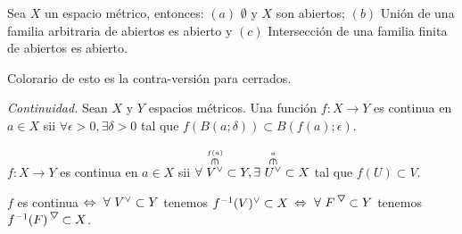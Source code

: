 \begin{proposition}
    Sea \(X\) un espacio métrico, entonces: \((a)\) \(\emptyset\text{ y } X\) son abiertos; \((b)\) Unión de una familia arbitraria de abiertos es abierto y \((c)\) Intersección de una familia finita de abiertos es abierto. 
\end{proposition} 
\begin{note}
    Colorario de esto es la contra-versión para cerrados. 
\end{note}
\begin{definition}
    \emph{Continuidad.} Sean \(X\text{\ y\ }Y\) espacios métricos. Una función \(f:X\to Y\) es continua en \(a\in X\) sii \(\forall\epsilon >0,\exists \delta >0\) tal que \(f(B(a;\delta))\subset B(f(a);\epsilon)\). 
\end{definition}
\begin{proposition}
    \(f:X\to Y\) es continua en \(a\in X\) sii \(\forall\ \overset{\overset{\text{$f(a)$}}{\rotatebox{-90}{$\in$}}}{V^\ab}\subset Y, \exists \ \overset{\overset{\text{$a$}}{\rotatebox{-90}{$\in$}}}{U^\ab}\subset X\) tal que \(f(U)\subset V\). 
\end{proposition}
\begin{proposition}
    \(f\) es continua \(\Leftrightarrow \ \forall \ V^\ab\subset Y\) tenemos \(f^{-1}(V)^\ab \subset X\) \(\Leftrightarrow \ \forall \ F^\ce\subset Y\) tenemos \( f^{-1}(F)^\ce \subset X\). 
\end{proposition}

